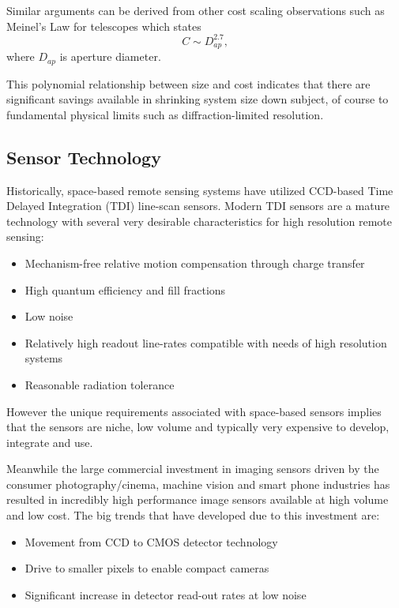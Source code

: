 \documentclass[]{spieman}  %
\begin{document}
Similar arguments can be derived from other cost scaling observations such as Meinel's Law \cite{meinel} for telescopes which states
\begin{equation}
    C \sim D_{ap}^{2.7},
\end{equation}
where $D_{ap}$ is aperture diameter.

This polynomial relationship between size and cost indicates that there are significant savings available in shrinking system size down subject, of course to fundamental physical limits such as diffraction-limited resolution.  

\subsection{Sensor Technology}
\label{sec:sensor_trends}

Historically, space-based remote sensing systems have utilized CCD-based Time Delayed Integration (TDI) line-scan sensors.  Modern TDI sensors are a mature technology with several very desirable characteristics for high resolution remote sensing:

\begin{itemize}
    \item Mechanism-free relative motion compensation through charge transfer
    \item High quantum efficiency and fill fractions
    \item Low noise
    \item Relatively high readout line-rates compatible with needs of high resolution systems
    \item Reasonable radiation tolerance
\end{itemize}

However the unique requirements associated with space-based sensors implies that the sensors are niche, low volume and typically very expensive to develop, integrate and use.

Meanwhile the large commercial investment in imaging sensors driven by the consumer photography/cinema, machine vision and smart phone industries has resulted in incredibly high performance image sensors available at high volume and low cost.  The big trends that have developed due to this investment are:

\begin{itemize}
    \item Movement from CCD to CMOS detector technology
    \item Drive to smaller pixels to enable compact cameras \cite{isscc2016}
    \item Significant increase in detector read-out rates at low noise
\end{itemize}
\end{document}
